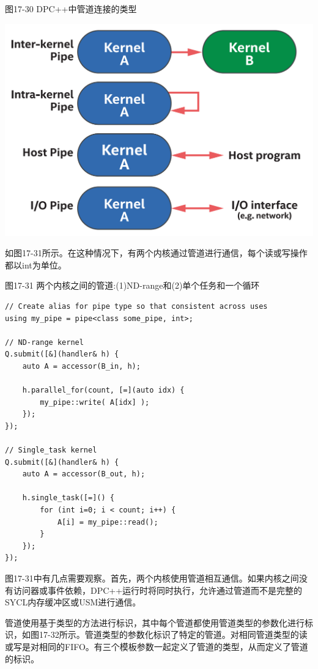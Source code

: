 \hspace*{\fill} \par %
图17-30 DPC++中管道连接的类型
\begin{center}
	\includegraphics[width=1.0\textwidth]{content/chapter-17/images/25}
\end{center}

如图17-31所示。在这种情况下，有两个内核通过管道进行通信，每个读或写操作都以int为单位。\par

\hspace*{\fill} \par %
图17-31 两个内核之间的管道:(1)ND-range和(2)单个任务和一个循环
\begin{lstlisting}[caption={}]
// Create alias for pipe type so that consistent across uses
using my_pipe = pipe<class some_pipe, int>;

// ND-range kernel
Q.submit([&](handler& h) {
	auto A = accessor(B_in, h);
	
	h.parallel_for(count, [=](auto idx) {
		my_pipe::write( A[idx] );
	});
});

// Single_task kernel
Q.submit([&](handler& h) {
	auto A = accessor(B_out, h);
	
	h.single_task([=]() {
		for (int i=0; i < count; i++) {
			A[i] = my_pipe::read();
		}
	});
});
\end{lstlisting}

图17-31中有几点需要观察。首先，两个内核使用管道相互通信。如果内核之间没有访问器或事件依赖，DPC++运行时将同时执行，允许通过管道而不是完整的SYCL内存缓冲区或USM进行通信。\par

管道使用基于类型的方法进行标识，其中每个管道都使用管道类型的参数化进行标识，如图17-32所示。管道类型的参数化标识了特定的管道。对相同管道类型的读或写是对相同的FIFO。有三个模板参数一起定义了管道的类型，从而定义了管道的标识。\par

